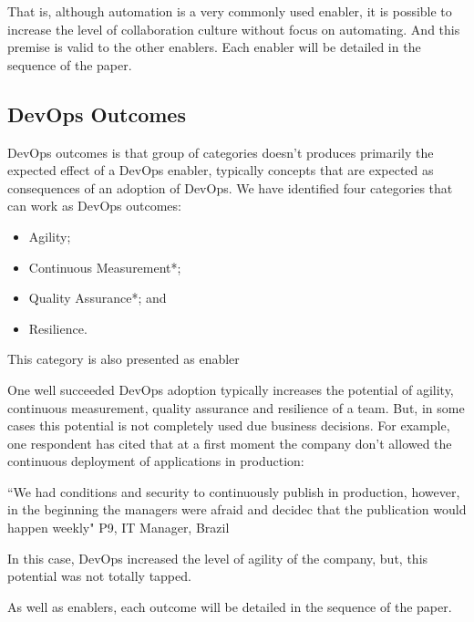 That is, although automation is a very commonly used enabler, it is possible to
increase the level of collaboration culture without focus on automating. And
this premise is valid to the other enablers. Each enabler will be detailed in
the sequence of the paper.

\subsection{DevOps Outcomes}
DevOps outcomes is that group of categories doesn't produces primarily the
expected effect of a DevOps enabler, typically concepts that are expected as
consequences of an adoption of DevOps. We have identified four categories that
can work as DevOps outcomes:

\begin{itemize}
\item Agility;
\item Continuous Measurement*;
\item Quality Assurance*; and
\item Resilience.
\end{itemize}

\footnotesize * This category is also presented as enabler


\normalsize
One well succeeded DevOps adoption typically increases the potential of
agility, continuous measurement, quality assurance and resilience of a team.
But, in some cases this potential is not completely used due business
decisions. For example, one respondent has cited that at a first moment the
company don't allowed the continuous deployment of applications in production:

``We had conditions and security to continuously publish in production,
however, in the beginning the managers were afraid and decidec that the
publication would happen weekly" P9, IT Manager, Brazil

In this case, DevOps increased the level of agility of the company, but, this
potential was not totally tapped.

As well as enablers, each outcome will be detailed in the sequence of the paper.
